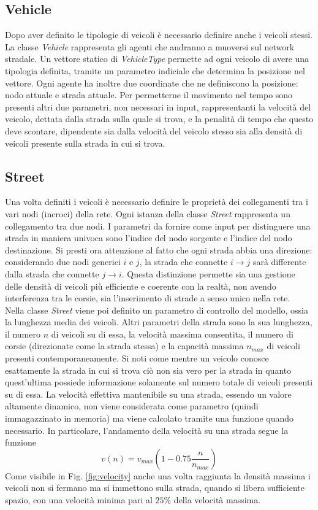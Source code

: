 \documentclass[../main.tex]{subfiles}
\begin{document}
\subsection{Vehicle}
Dopo aver definito le tipologie di veicoli \`e necessario definire anche i veicoli stessi.
La classe \emph{Vehicle} rappresenta gli agenti che andranno a muoversi sul network stradale.
Un vettore statico di \emph{VehicleType} permette ad ogni veicolo di avere una tipologia definita, tramite un parametro indiciale che determina la posizione nel vettore.
Ogni agente ha inoltre due coordinate che ne definiscono la posizione: nodo attuale e strada attuale.
Per permetterne il movimento nel tempo sono presenti altri due parametri, non necessari in input, rappresentanti la velocità del veicolo, dettata dalla strada sulla quale si trova, e la penalità di tempo che questo deve scontare, dipendente sia dalla velocità del veicolo stesso sia alla densità di veicoli presente sulla strada in cui si trova.
\subsection{Street}
Una volta definiti i veicoli \`e necessario definire le proprietà dei collegamenti tra i vari nodi (incroci) della rete.
Ogni istanza della classe \emph{Street} rappresenta un collegamento tra due nodi.
I parametri da fornire come input per distinguere una strada in maniera univoca sono l'indice del nodo sorgente e l'indice del nodo destinazione.
Si presti ora attenzione al fatto che ogni strada abbia una direzione: considerando due nodi generici $i$ e $j$, la strada che connette $i\to j$ sarà differente dalla strada che connette $j \to i$.
Questa distinzione permette sia una gestione delle densità di veicoli più efficiente e coerente con la realtà, non avendo interferenza tra le corsie, sia l'inserimento di strade a senso unico nella rete.\\
Nella classe \emph{Street} viene poi definito un parametro di controllo del modello, ossia la lunghezza media dei veicoli.
Altri parametri della strada sono la sua lunghezza, il numero $n$ di veicoli su di essa, la velocità massima consentita, il numero di corsie (direzionate come la strada stessa) e la capacità massima $n_{max}$ di veicoli presenti contemporaneamente.
Si noti come mentre un veicolo conosce esattamente la strada in cui si trova ciò non sia vero per la strada in quanto quest'ultima possiede informazione solamente sul numero totale di veicoli presenti su di essa.
La velocità effettiva mantenibile su una strada, essendo un valore altamente dinamico, non viene considerata come parametro (quindi immagazzinato in memoria) ma viene calcolato tramite una funzione quando necessario.
In particolare, l'andamento della velocità su una strada segue la funzione
\begin{equation}
    v(n)=v_{max}\left(1-0.75\frac{n}{n_{max}}\right)
    \label{equation:velocity}
\end{equation}
Come visibile in Fig. \ref{fig:velocity} anche una volta raggiunta la densità massima i veicoli non si fermano ma si immettono sulla strada, quando si libera sufficiente spazio, con una velocità minima pari al $25\%$ della velocità massima.
\end{document}
